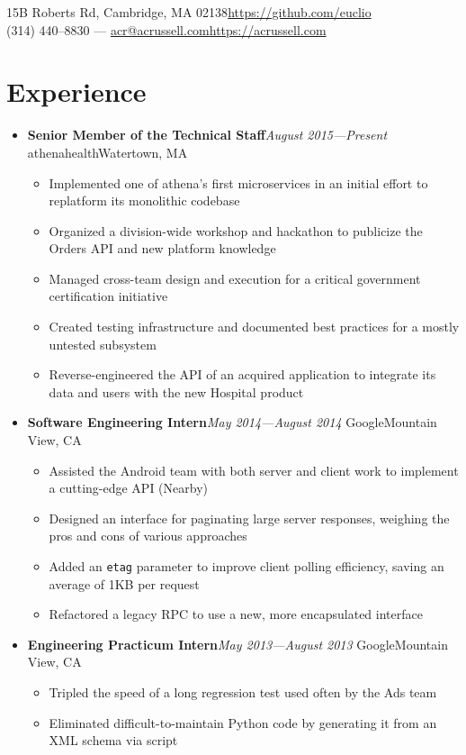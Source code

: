 \documentclass[10pt]{article}
\makeatletter
\newcommand{\name}{Andrew C. Russell}
\newcommand{\address}{15B Roberts Rd, Cambridge, MA 02138}
\newcommand{\telephone}{(314) 440--8830}
\newcommand{\email}{acr@acrussell.com}
\newcommand{\website}{https://acrussell.com}
\newcommand{\github}{https://github.com/euclio}
\newcommand\contact{{
    \begin{center}\noindent{\LARGE\textbf{\name}}\end{center}
    \address{}\hfill\url{\github}\\
    \telephone{} --- \url{\email}\hfill\url{\website}%
}}
\newcommand\divider{{
        \noindent\hrulefill{}%
}}
\newcommand\experienceentry[4]{%
\textbf{#3}\hfill\textit{#4}%
\newline#1\hfill#2%
}
\makeatother
\begin{document}
\pagestyle{empty}

\contact{}

\divider{}

\section*{Experience}
\begin{itemize}[label=,leftmargin=0pt]
    \item \experienceentry{athenahealth}{Watertown, MA}{Senior Member of the Technical Staff}{August 2015---Present}
        \begin{itemize}[topsep=4pt]
        \item Implemented one of athena's first microservices in an initial
        effort to replatform its monolithic codebase
        \item Organized a division-wide workshop and hackathon to publicize the
        Orders API and new platform knowledge
        \item Managed cross-team design and execution for a critical
        government certification initiative
        \item Created testing infrastructure and documented best practices for a
        mostly untested subsystem
        \item Reverse-engineered the API of an acquired application to integrate
        its data and users with the new Hospital product
        \end{itemize}
    \item \experienceentry{Google}{Mountain View, CA}
        {Software Engineering Intern}{May 2014---August 2014}
        \begin{itemize}[topsep=4pt]
            \item Assisted the Android team with both server and client work to
                implement a cutting-edge API (Nearby)
            \item Designed an interface for paginating large server responses,
            weighing the pros and cons of various approaches
            \item Added an \texttt{etag} parameter to improve client polling efficiency,
            saving an average of 1KB per request
            \item Refactored a legacy RPC to use a new, more encapsulated
            interface
        \end{itemize}
    \item \experienceentry{Google}{Mountain View, CA}
        {Engineering Practicum Intern}{May 2013---August 2013}
        \begin{itemize}[topsep=4pt]
            \item Tripled the speed of a long regression test used often by the
                Ads team
                \item Eliminated difficult-to-maintain Python code by generating
                it from an XML schema via script
        \end{itemize}
\end{itemize}
\end{document}
